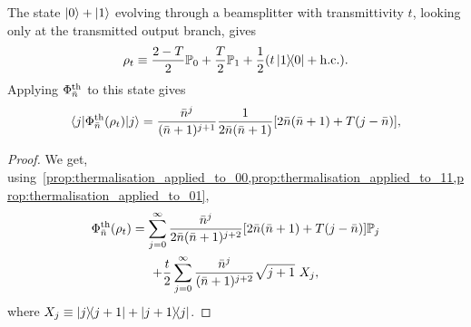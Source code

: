 \documentclass[12pt]{report}
\newcommand{\PP}{\mathbb{P}}
\begin{document}
\begin{prop}
	The state $\ket0+\ket1$ evolving through a beamsplitter with transmittivity $t$, looking only at the transmitted output branch, gives
	\begin{equation}
		\rho_t
		\equiv
		\frac{2-T}{2} \PP_0
		+ \frac{T}{2} \PP_1
		+ \frac12 (t \ketbra{1}{0} + \mathrm{h.c.}).
	\end{equation}
	Applying $\Phi^{\rm th}_{\bar n}$ to this state gives
	\begin{equation}
	\begin{gathered}
		\langle j|\Phi^{\rm th}_{\bar n}(\rho_t)|j\rangle
		= \frac{\bar n^j}{(\bar n + 1)^{j+1}}
		\frac{1}{2\bar n(\bar n+1)}
		[2\bar n(\bar n+1) + T(j-\bar n)],
	\end{gathered}
	\end{equation}
\end{prop}
\begin{proof}
	We get, using~\cref{prop:thermalisation_applied_to_00,prop:thermalisation_applied_to_11,prop:thermalisation_applied_to_01},
	\begin{equation}
	\begin{gathered}
		\Phi_{\bar n}^{\rm th}(\rho_t)
		= \sum_{j=0}^\infty
		\frac{\bar n^j}{2\bar n(\bar n + 1)^{j+2}}
		[2\bar n(\bar n+1) + T(j-\bar n)]
		\PP_j \\
		+ \frac{t}{2}\sum_{j=0}^\infty
		\frac{\bar n^j}{(\bar n + 1)^{j+2}} \sqrt{j+1} \,\, X_j,
	\end{gathered}
	\end{equation}
	where $X_j \equiv \ketbra{j}{j+1} + \ketbra{j+1}{j}$.
\end{proof}
\end{document}
